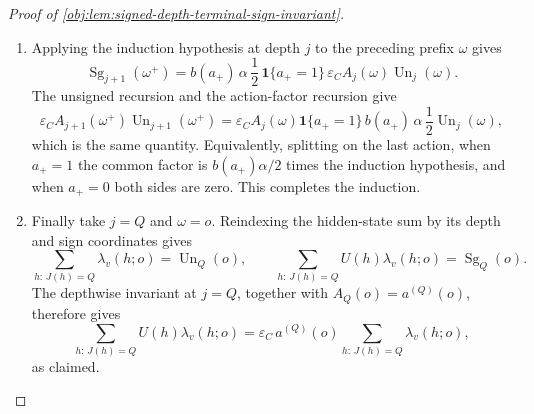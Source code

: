 \documentclass[11pt]{article}
\begin{document}
\begin{proof}[Proof of \cref{obj:lem:signed-depth-terminal-sign-invariant}]
\begin{enumerate}
\item Applying the induction hypothesis at depth \(j\) to the preceding prefix \(\omega\) gives
\[
\operatorname{Sg}_{j+1}(\omega^+)
=
b(a_+)\,\alpha\,\frac12\,
\mathbf 1\{a_+=1\}\,
\varepsilon_C A_j(\omega)\operatorname{Un}_j(\omega).
\]
The unsigned recursion and the action-factor recursion give
\[
\varepsilon_C A_{j+1}(\omega^+)
\operatorname{Un}_{j+1}(\omega^+)
=
\varepsilon_C A_j(\omega)\mathbf 1\{a_+=1\}\,
 b(a_+)\,\alpha\,\frac12\operatorname{Un}_j(\omega),
\]
which is the same quantity.  Equivalently, splitting on the last action, when \(a_+=1\) the common factor is \(b(a_+)\alpha/2\) times the induction hypothesis, and when \(a_+=0\) both sides are zero.  This completes the induction.

\item Finally take \(j=Q\) and \(\omega=o\).  Reindexing the hidden-state sum by its depth and sign coordinates gives
\[
\sum_{h:\,J(h)=Q}\lambda_v(h;o)=\operatorname{Un}_Q(o),
\qquad
\sum_{h:\,J(h)=Q}U(h)\lambda_v(h;o)=\operatorname{Sg}_Q(o).
\]
The depthwise invariant at \(j=Q\), together with \(A_Q(o)=a^{(Q)}(o)\), therefore gives
\[
\sum_{h:\,J(h)=Q} U(h)\lambda_v(h;o)
=
\varepsilon_C\,a^{(Q)}(o)
\sum_{h:\,J(h)=Q}\lambda_v(h;o),
\]
as claimed.
\end{enumerate}
\end{proof}
\end{document}
